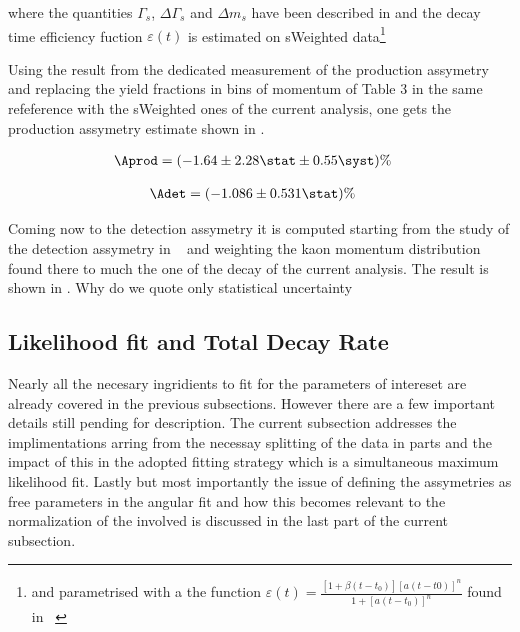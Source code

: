 \noindent where the quantities $\Gamma_s$, $\Delta\Gamma_s$ and $\Delta m_s$ have been described in 
and the decay time efficiency fuction $\varepsilon(t)$ is estimated on sWeighted \BsJpsiKst 
data\footnote{and parametrised with a the function $\varepsilon(t)= \frac{[1+\beta(t-t_0)][a(t-t0)]^n}{1+[a(t-t_0)]^n}$ found in ~\cite{LHCb-PAPER-2014-053}}

Using the result from the dedicated \lhcb measurement of the production assymetry ~\cite{LHCb-PAPER-2014-042}
and replacing the yield fractions in bins of \Bs momentum of Table 3 in the same refeference with the sWeighted \BsJpsiKst ones of the current analysis, 
one gets the production assymetry estimate shown in .

\begin{align}
\Aprod &= (-1.64 \pm 2.28 \stat \pm 0.55 \syst)\%
\label{prod_assym}
\end{align}

\begin{align}
\Adet &= (-1.086 \pm 0.531 \stat)\%
\label{det_assym}
\end{align}
 
\noindent Coming now to the detection assymetry it is computed starting from the \lhcb study of the detection assymetry
in ~\cite{LHCb-PAPER-2014-013} and weighting the kaon momentum distribution found there to much the one of the \BsJpsiKst
decay of the current analysis. The result is shown in . {\color{red} Why do we quote only statistical uncertainty}

\subsection{Likelihood fit and Total Decay Rate}
\label{Total_Decay_Rate}

Nearly all the necesary ingridients to fit for the parameters of intereset are already covered in the previous subsections.
However there are a few important details still pending for description. The current subsection addresses the 
implimentations arring from the necessay splitting of the data in parts and the impact of this in the adopted
fitting strategy which is a simultaneous maximum likelihood fit. Lastly but most importantly the issue of defining the \ACP 
assymetries as free parameters in the angular fit and how this becomes relevant to the normalization of the \pdfs
involved is discussed in the last part of the current subsection.


